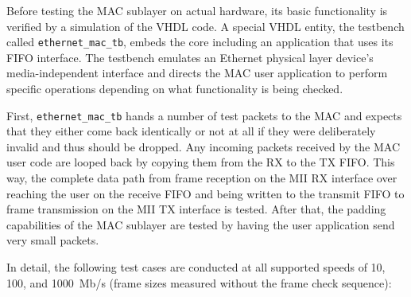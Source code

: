 \documentclass[a4paper, 11pt, oneside]{Thesis}  %
\begin{document}
Before testing the MAC sublayer on actual hardware, its basic functionality is verified by a simulation of the VHDL code. A special VHDL entity, the testbench called \texttt{ethernet\_mac\_tb}, embeds the core including an application that uses its FIFO interface. The testbench emulates an Ethernet physical layer device's media-independent interface and directs the MAC user application to perform specific operations depending on what functionality is being checked.

First, \texttt{ethernet\_mac\_tb} hands a number of test packets to the MAC and expects that they either come back identically or not at all if they were deliberately invalid and thus should be dropped. Any incoming packets received by the MAC user code are looped back by copying them from the RX to the TX FIFO. This way, the complete data path from frame reception on the MII RX interface over reaching the user on the receive FIFO and being written to the transmit FIFO to frame transmission on the MII TX interface is tested. After that, the padding capabilities of the MAC sublayer are tested by having the user application send very small packets.

In detail, the following test cases are conducted at all supported speeds of 10, 100, and 1000~Mb/s (frame sizes measured without the frame check sequence):%
\end{document}

